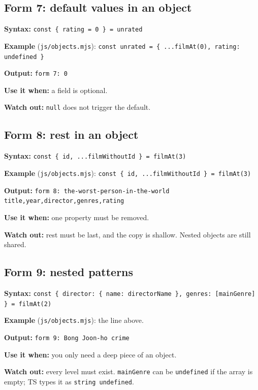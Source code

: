 \documentclass[
  11pt,
]{article}
\begin{document}
\subsection{Form 7: default values in an
object}\label{form-7-default-values-in-an-object}

\textbf{Syntax:}
\texttt{const \{ rating = 0 \} = unrated}

\textbf{Example} (\texttt{js/objects.mjs}):
\texttt{const unrated = \{ ...filmAt(0), rating: undefined \}}

\textbf{Output:} \texttt{form 7: 0}

\textbf{Use it when:} a field is optional.

\textbf{Watch out:} \texttt{null} does not trigger the
default.

\subsection{Form 8: rest in an object}\label{form-8-rest-in-an-object}

\textbf{Syntax:}
\texttt{const \{ id, ...filmWithoutId \} = filmAt(3)}

\textbf{Example} (\texttt{js/objects.mjs}):
\texttt{const \{ id, ...filmWithoutId \} = filmAt(3)}

\textbf{Output:}
\texttt{form 8: the-worst-person-in-the-world title,year,director,genres,rating}

\textbf{Use it when:} one property must be removed.

\textbf{Watch out:} rest must be last, and the copy is shallow. Nested
objects are still shared.

\subsection{Form 9: nested patterns}\label{form-9-nested-patterns}

\textbf{Syntax:}
\texttt{const \{ director: \{ name: directorName \}, genres: [mainGenre] \} = filmAt(2)}

\textbf{Example} (\texttt{js/objects.mjs}): the line
above.

\textbf{Output:} \texttt{form 9: Bong Joon-ho crime}

\textbf{Use it when:} you only need a deep piece of an object.

\textbf{Watch out:} every level must exist.
\texttt{mainGenre} can be
\texttt{undefined} if the array is empty; TS types it
as \texttt{string \textbar{} undefined}.
\end{document}
